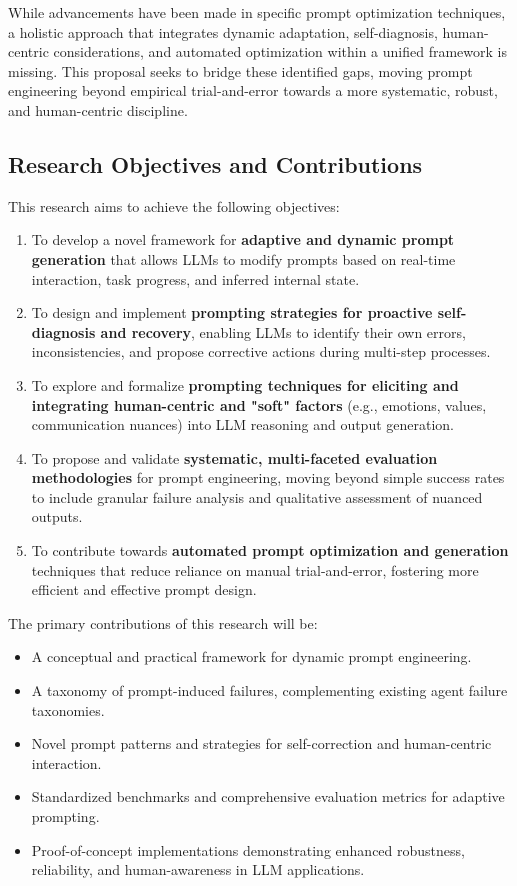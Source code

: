 \documentclass{article}
\begin{document}
While advancements have been made in specific prompt optimization techniques, a holistic approach that integrates dynamic adaptation, self-diagnosis, human-centric considerations, and automated optimization within a unified framework is missing. This proposal seeks to bridge these identified gaps, moving prompt engineering beyond empirical trial-and-error towards a more systematic, robust, and human-centric discipline.

\subsection{Research Objectives and Contributions}
This research aims to achieve the following objectives:
\begin{enumerate}
    \item To develop a novel framework for \textbf{adaptive and dynamic prompt generation} that allows LLMs to modify prompts based on real-time interaction, task progress, and inferred internal state.
    \item To design and implement \textbf{prompting strategies for proactive self-diagnosis and recovery}, enabling LLMs to identify their own errors, inconsistencies, and propose corrective actions during multi-step processes.
    \item To explore and formalize \textbf{prompting techniques for eliciting and integrating human-centric and "soft" factors} (e.g., emotions, values, communication nuances) into LLM reasoning and output generation.
    \item To propose and validate \textbf{systematic, multi-faceted evaluation methodologies} for prompt engineering, moving beyond simple success rates to include granular failure analysis and qualitative assessment of nuanced outputs.
    \item To contribute towards \textbf{automated prompt optimization and generation} techniques that reduce reliance on manual trial-and-error, fostering more efficient and effective prompt design.
\end{enumerate}

The primary contributions of this research will be:
\begin{itemize}
    \item A conceptual and practical framework for dynamic prompt engineering.
    \item A taxonomy of prompt-induced failures, complementing existing agent failure taxonomies.
    \item Novel prompt patterns and strategies for self-correction and human-centric interaction.
    \item Standardized benchmarks and comprehensive evaluation metrics for adaptive prompting.
    \item Proof-of-concept implementations demonstrating enhanced robustness, reliability, and human-awareness in LLM applications.
\end{itemize}
\end{document}

